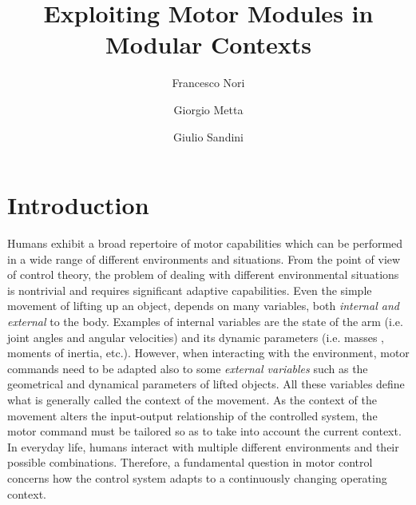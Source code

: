\documentclass{svmult}
\begin{document}
\title{Exploiting Motor Modules in Modular Contexts}
\author{Francesco Nori\and
Giorgio Metta \and Giulio Sandini}
%
%
\maketitle


\section{Introduction}

Humans exhibit a broad repertoire of motor capabilities which can be
performed in a wide range of different environments and situations.
From the point of view of control theory, the problem of dealing
with different environmental situations is nontrivial and requires
significant adaptive capabilities. Even the simple movement of
lifting up an object, depends on many variables, both {\em internal
and external} to the body.
Examples of internal variables
are the state of the arm (i.e. joint angles and angular velocities)
and its dynamic parameters (i.e. masses , moments of inertia, etc.).
However, when interacting with the environment, motor commands need
to be adapted also to some {\em external variables} such as the
geometrical and dynamical parameters of lifted objects.
All these variables define what is generally called the context of
the movement. As the context of the movement alters the input-output
relationship of the controlled system, the motor command must be
tailored so as to take into account the current context. In everyday
life, humans interact with multiple different environments and their
possible combinations. Therefore, a fundamental question in motor
control concerns how the control system adapts to a continuously
changing operating context.
\end{document}
